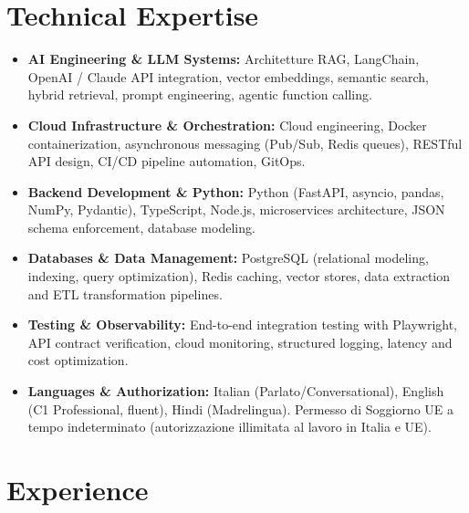 \documentclass[10pt,a4paper]{article}
\begin{document}
\section{Technical Expertise}
\begin{itemize}
  \item \textbf{AI Engineering \& LLM Systems:} Architetture RAG, LangChain, OpenAI / Claude API integration, vector embeddings, semantic search, hybrid retrieval, prompt engineering, agentic function calling.
  \item \textbf{Cloud Infrastructure \& Orchestration:} Cloud engineering, Docker containerization, asynchronous messaging (Pub/Sub, Redis queues), RESTful API design, CI/CD pipeline automation, GitOps.
  \item \textbf{Backend Development \& Python:} Python (FastAPI, asyncio, pandas, NumPy, Pydantic), TypeScript, Node.js, microservices architecture, JSON schema enforcement, database modeling.
  \item \textbf{Databases \& Data Management:} PostgreSQL (relational modeling, indexing, query optimization), Redis caching, vector stores, data extraction and ETL transformation pipelines.
  \item \textbf{Testing \& Observability:} End-to-end integration testing with Playwright, API contract verification, cloud monitoring, structured logging, latency and cost optimization.
  \item \textbf{Languages \& Authorization:} Italian (Parlato/Conversational), English (C1 Professional, fluent), Hindi (Madrelingua). Permesso di Soggiorno UE a tempo indeterminato (autorizzazione illimitata al lavoro in Italia e UE).
\end{itemize}

\section{Experience}
\end{document}
